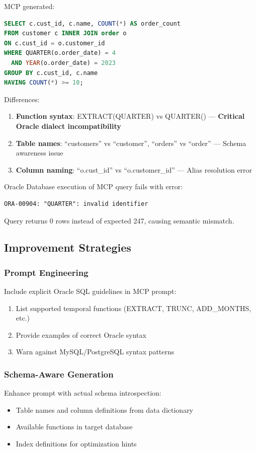 MCP generated:
\begin{lstlisting}[language=SQL, basicstyle=\footnotesize\ttfamily]
SELECT c.cust_id, c.name, COUNT(*) AS order_count
FROM customer c INNER JOIN order o
ON c.cust_id = o.customer_id
WHERE QUARTER(o.order_date) = 4
  AND YEAR(o.order_date) = 2023
GROUP BY c.cust_id, c.name
HAVING COUNT(*) >= 10;
\end{lstlisting}

Differences:
\begin{enumerate}
    \item \textbf{Function syntax}: EXTRACT(QUARTER) vs QUARTER() — \textbf{Critical Oracle dialect incompatibility}
    \item \textbf{Table names}: ``customers'' vs ``customer'', ``orders'' vs ``order'' — Schema awareness issue
    \item \textbf{Column naming}: ``o.cust\_id'' vs ``o.customer\_id'' — Alias resolution error
\end{enumerate}

Oracle Database execution of MCP query fails with error:
\begin{verbatim}
ORA-00904: "QUARTER": invalid identifier
\end{verbatim}

Query returns 0 rows instead of expected 247, causing semantic mismatch.

\subsection{Improvement Strategies}

\subsubsection{Prompt Engineering}
Include explicit Oracle SQL guidelines in MCP prompt:
\begin{enumerate}
    \item List supported temporal functions (EXTRACT, TRUNC, ADD\_MONTHS, etc.)
    \item Provide examples of correct Oracle syntax
    \item Warn against MySQL/PostgreSQL syntax patterns
\end{enumerate}

\subsubsection{Schema-Aware Generation}
Enhance prompt with actual schema introspection:
\begin{itemize}
    \item Table names and column definitions from data dictionary
    \item Available functions in target database
    \item Index definitions for optimization hints
\end{itemize}


